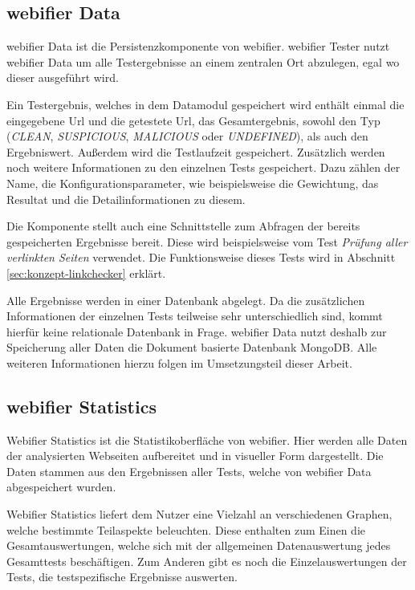 \subsection{webifier Data}
\label{sec:konzept-data}

webifier Data ist die Persistenzkomponente von webifier. webifier Tester nutzt webifier Data um alle Testergebnisse an einem zentralen Ort abzulegen, egal wo dieser ausgeführt wird.

Ein Testergebnis, welches in dem Datamodul gespeichert wird enthält einmal die eingegebene Url und die getestete Url, das Gesamtergebnis, sowohl den Typ (\textit{CLEAN}, \textit{SUSPICIOUS}, \textit{MALICIOUS} oder \textit{UNDEFINED}), als auch den Ergebniswert. Außerdem wird die Testlaufzeit gespeichert. Zusätzlich werden noch weitere Informationen zu den einzelnen Tests gespeichert. Dazu zählen der Name, die Konfigurationsparameter, wie beispielsweise die Gewichtung, das Resultat und die Detailinformationen zu diesem.

Die Komponente stellt auch eine Schnittstelle zum Abfragen der bereits gespeicherten Ergebnisse bereit. Diese wird beispielsweise vom Test \textit{Prüfung aller verlinkten Seiten} verwendet. Die Funktionsweise dieses Tests wird in Abschnitt \ref{sec:konzept-linkchecker} erklärt.

Alle Ergebnisse werden in einer Datenbank abgelegt. Da die zusätzlichen Informationen der einzelnen Tests teilweise sehr unterschiedlich sind, kommt hierfür keine relationale Datenbank in Frage. webifier Data nutzt deshalb zur Speicherung aller Daten die Dokument basierte Datenbank MongoDB. Alle weiteren Informationen hierzu folgen im Umsetzungsteil dieser Arbeit.

\subsection{webifier Statistics}
Webifier Statistics ist die Statistikoberfläche von webifier. Hier werden alle Daten der analysierten Webseiten aufbereitet und in visueller Form dargestellt. Die Daten stammen aus den Ergebnissen aller Tests, welche von webifier Data abgespeichert wurden.

Webifier Statistics liefert dem Nutzer eine Vielzahl an verschiedenen Graphen, welche bestimmte Teilaspekte beleuchten. Diese enthalten zum Einen die Gesamtauswertungen, welche sich mit der allgemeinen Datenauswertung jedes Gesamttests beschäftigen. Zum Anderen gibt es noch die Einzelauswertungen der Tests, die testspezifische Ergebnisse auswerten.

